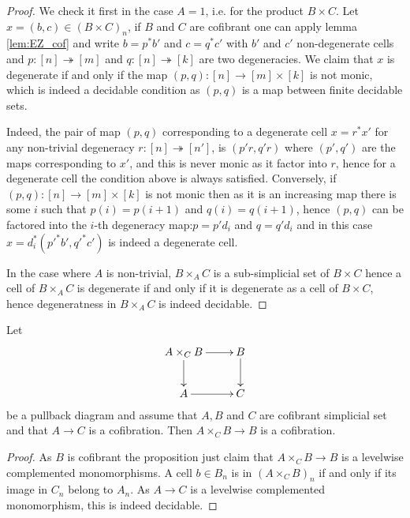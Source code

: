 \documentclass[reqno,10pt,a4paper,oneside,draft]{amsart}
\begin{document}
\begin{proof}
We check it first in the case $A=1$, i.e. for the product $B \times C$. Let $x = (b,c) \in (B \times C)_n$, if $B$ and $C$ are cofibrant one can apply lemma \ref{lem:EZ_cof} and write $b=p^* b'$ and $c=q^* c'$ with $b'$ and $c'$ non-degenerate cells and $p:[n] \twoheadrightarrow [m]$ and $q:[n] \twoheadrightarrow [k]$ are two degeneracies. We claim that $x$ is degenerate if and only if the map $(p,q):[n] \rightarrow [m] \times [k]$ is not monic, which is indeed a decidable condition as $(p,q)$ is a map between finite decidable sets.

Indeed, the pair of map $(p,q)$ corresponding to a degenerate cell $x=r^* x'$ for any non-trivial degeneracy $r:[n] \twoheadrightarrow [n']$, is  $(p'r,q'r)$ where $(p',q')$ are the maps corresponding to $x'$, and this is never monic as it factor into $r$, hence for a degenerate cell the condition above is always satisfied. Conversely, if $(p,q): [n] \rightarrow [m] \times [k]$ is not monic then as it is an increasing map there is some $i$ such that $p(i)=p(i+1)$ and $q(i)=q(i+1)$, hence $(p,q)$ can be factored into the $i$-th degeneracy map:$p=p' d_i$ and $q=q' d_i$ and in this case $x= d_i^* (p'^* b',q'^* c')$ is indeed a degenerate cell.


In the case where $A$ is non-trivial, $B \times_A C$ is a sub-simplicial set of $B \times C$ hence a cell of $B \times_A C$ is degenerate if and only if it is degenerate as a cell of $B \times C$, hence degeneratness in $B \times_A C$ is indeed decidable. 
\end{proof}


\begin{proposition} \label{thm:cof-pbk} Let
\[
\xymatrix{
A \times_C B \ar[r] \ar[d] &  B \ar[d] \\
A \ar[r] & C}
\]
be a pullback diagram and assume that $A,B$ and $C$ are cofibrant simplicial set and that $A \rightarrow C$ is a cofibration. Then $A \times_C B \rightarrow B$ is a cofibration.
\end{proposition}

\begin{proof} As $B$ is cofibrant the proposition just claim that $A \times_C B \rightarrow B$ is a levelwise complemented monomorphisms. A cell $b \in B_n$ is in  $(A \times_C B)_n$ if and only if its image in $C_n$ belong to $A_n$. As $A \rightarrow C$ is a levelwise complemented monomorphism, this is indeed decidable.
\end{proof} 
\end{document}
